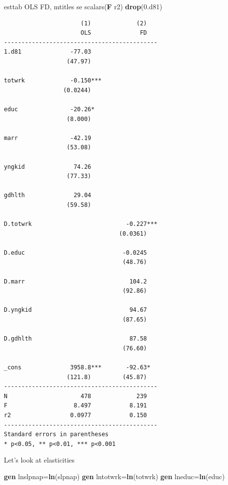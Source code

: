 \documentclass[
]{book}
\newenvironment{Shaded}{\begin{snugshade}}{\end{snugshade}}
\newcommand{\FunctionTok}[1]{\textcolor[rgb]{0.13,0.29,0.53}{\textbf{#1}}}
\newcommand{\KeywordTok}[1]{\textcolor[rgb]{0.13,0.29,0.53}{\textbf{#1}}}
\newcommand{\NormalTok}[1]{#1}
\begin{document}
\begin{Shaded}
\begin{Highlighting}[]
\NormalTok{esttab OLS FD, mtitles se scalars(}\FunctionTok{F}\NormalTok{ r2) }\KeywordTok{drop}\NormalTok{(0.d81)}
\end{Highlighting}
\end{Shaded}

\begin{verbatim}
                      (1)             (2)   
                      OLS              FD   
--------------------------------------------
1.d81              -77.03                   
                  (47.97)                   

totwrk             -0.150***                
                 (0.0244)                   

educ               -20.26*                  
                  (8.000)                   

marr               -42.19                   
                  (53.08)                   

yngkid              74.26                   
                  (77.33)                   

gdhlth              29.04                   
                  (59.58)                   

D.totwrk                           -0.227***
                                 (0.0361)   

D.educ                            -0.0245   
                                  (48.76)   

D.marr                              104.2   
                                  (92.86)   

D.yngkid                            94.67   
                                  (87.65)   

D.gdhlth                            87.58   
                                  (76.60)   

_cons              3958.8***       -92.63*  
                  (121.8)         (45.87)   
--------------------------------------------
N                     478             239   
F                   8.497           8.191   
r2                 0.0977           0.150   
--------------------------------------------
Standard errors in parentheses
* p<0.05, ** p<0.01, *** p<0.001
\end{verbatim}

Let's look at elasticities

\begin{Shaded}
\begin{Highlighting}[]
\KeywordTok{gen}\NormalTok{ lnslpnap=}\FunctionTok{ln}\NormalTok{(slpnap)}
\KeywordTok{gen}\NormalTok{ lntotwrk=}\FunctionTok{ln}\NormalTok{(totwrk)}
\KeywordTok{gen}\NormalTok{ lneduc=}\FunctionTok{ln}\NormalTok{(educ)}
\end{Highlighting}
\end{Shaded}
\end{document}
